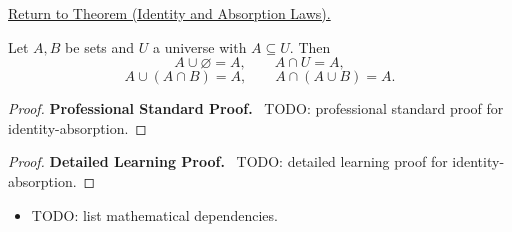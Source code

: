 \newpage
{}
\label{prf:identity-absorption}

\begin{remark*}[Return]
\hyperref[thm:identity-absorption]{Return to Theorem (Identity and Absorption Laws).}
\end{remark*}

\begin{theorem*}
Let $A,B$ be sets and $U$ a universe with $A \subseteq U$. Then
\[
A \cup \varnothing = A,
\qquad
A \cap U = A,
\]
\[
A \cup (A \cap B) = A,
\qquad
A \cap (A \cup B) = A.
\]
\end{theorem*}

\begin{proof}
\textbf{Professional Standard Proof.}~
TODO: professional standard proof for identity-absorption.
\end{proof}

\begin{proof}
\textbf{Detailed Learning Proof.}~
TODO: detailed learning proof for identity-absorption.
\end{proof}

\begin{remark*}
\end{remark*}

\begin{dependencies}
\begin{itemize}
  \item TODO: list mathematical dependencies.
\end{itemize}
\end{dependencies}

\clearpage
